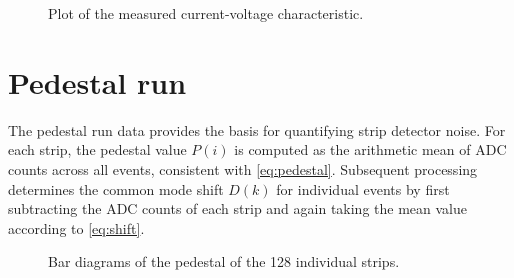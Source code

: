 \begin{figure}[H]
	\centering
	\caption{Plot of the measured current-voltage characteristic.}
	\label{fig:depletion}
\end{figure}
\section{Pedestal run}

The pedestal run data provides the basis for quantifying strip detector noise. For each strip, the pedestal value $P(i)$ is computed as the arithmetic mean of ADC counts across all events, consistent with \cref{eq:pedestal}. Subsequent processing determines the common mode shift $D(k)$ for individual events by first subtracting the ADC counts of each
strip and again taking the mean value according to \cref{eq:shift}.

\begin{figure}[H]
	\centering
	\caption{Bar diagrams of the pedestal of the 128 individual strips.}
	\label{fig:pedestal}
\end{figure}

